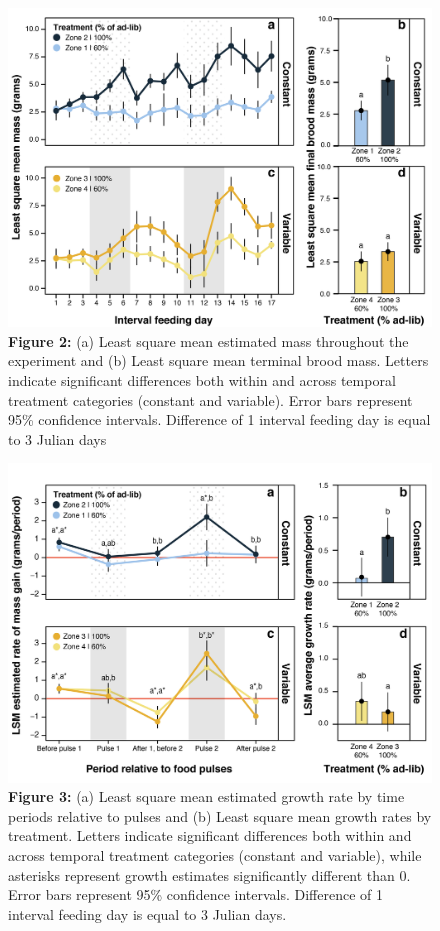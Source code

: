 \documentclass[11pt,]{article}
\begin{document}
\begin{figure}
\centering
\includegraphics{./fig2_mc_mass.png}
\caption{\textbf{Figure 2:} (a) Least square mean estimated mass
throughout the experiment and (b) Least square mean terminal brood mass.
Letters indicate significant differences both within and across temporal
treatment categories (constant and variable). Error bars represent 95\%
confidence intervals. Difference of 1 interval feeding day is equal to 3
Julian days}
\end{figure}

\begin{figure}
\centering
\includegraphics{./fig3_mc_growth.png}
\caption{\textbf{Figure 3:} (a) Least square mean estimated growth rate
by time periods relative to pulses and (b) Least square mean growth
rates by treatment. Letters indicate significant differences both within
and across temporal treatment categories (constant and variable), while
asterisks represent growth estimates significantly different than 0.
Error bars represent 95\% confidence intervals. Difference of 1 interval
feeding day is equal to 3 Julian days.}
\end{figure}
\end{document}
